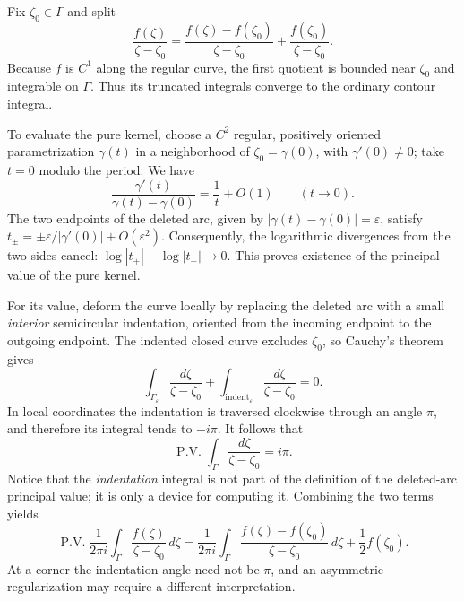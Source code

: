 \begin{solution}
Fix $\zeta_0\in\Gamma$ and split
\[
\frac{f(\zeta)}{\zeta-\zeta_0}=
\frac{f(\zeta)-f(\zeta_0)}{\zeta-\zeta_0}
+\frac{f(\zeta_0)}{\zeta-\zeta_0}.
\]
Because $f$ is $C^1$ along the regular curve, the first quotient is bounded
near $\zeta_0$ and integrable on $\Gamma$. Thus its truncated integrals
converge to the ordinary contour integral.

To evaluate the pure kernel, choose a $C^2$ regular, positively oriented
parametrization $\gamma(t)$ in a neighborhood of $\zeta_0=\gamma(0)$,
with $\gamma'(0)\ne0$; take $t=0$ modulo the period. We have
\[
\frac{\gamma'(t)}{\gamma(t)-\gamma(0)}=\frac1t+O(1)
\qquad(t\to0).
\]
The two endpoints of the deleted arc, given by
$|\gamma(t)-\gamma(0)|=\varepsilon$, satisfy
$t_\pm=\pm\varepsilon/|\gamma'(0)|+O(\varepsilon^2)$.
Consequently, the logarithmic divergences from the two sides cancel:
$\log|t_+| - \log|t_-|\to0$. This proves existence of the
principal value of the pure kernel.

For its value, deform the curve locally by replacing the deleted arc
with a small \emph{interior} semicircular indentation, oriented from the
incoming endpoint to the outgoing endpoint. The indented closed curve
excludes $\zeta_0$, so Cauchy's theorem gives
\[
\int_{\Gamma_\varepsilon}\frac{d\zeta}{\zeta-\zeta_0}
+\int_{\mathrm{indent}_\varepsilon}
\frac{d\zeta}{\zeta-\zeta_0}=0.
\]
In local coordinates the indentation is traversed clockwise through an
angle $\pi$, and therefore its integral tends to $-i\pi$.
It follows that
\[
\operatorname{P.V.}\int_\Gamma\frac{d\zeta}{\zeta-\zeta_0}
=i\pi.
\]
Notice that the \emph{indentation} integral is not part of the definition
of the deleted-arc principal value; it is only a device for computing it.
Combining the two terms yields
\[
\operatorname{P.V.}\frac1{2\pi i}\int_\Gamma
\frac{f(\zeta)}{\zeta-\zeta_0}\,d\zeta
=\frac1{2\pi i}\int_\Gamma
\frac{f(\zeta)-f(\zeta_0)}{\zeta-\zeta_0}\,d\zeta
+\frac12f(\zeta_0).
\]
At a corner the indentation angle need not be $\pi$, and an asymmetric
regularization may require a different interpretation.
\end{solution}

